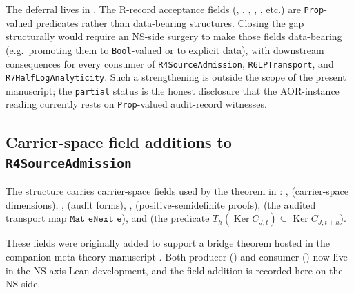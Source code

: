 \documentclass[11pt]{article}
\DeclareMathOperator{\Ker}{Ker}
\theoremstyle{definition}
\begin{document}
The deferral lives in
.  The R-record acceptance
fields (, ,
, ,
, etc.) are \texttt{Prop}-valued
predicates rather than data-bearing structures.  Closing the gap
structurally would require an NS-side surgery to make those fields
data-bearing (e.g.\ promoting them to \texttt{Bool}-valued or to
explicit data), with downstream consequences for every consumer of
\texttt{R4SourceAdmission}, \texttt{R6LPTransport}, and
\texttt{R7HalfLogAnalyticity}.  Such a strengthening is outside the
scope of the present manuscript; the \texttt{partial} status is the
honest disclosure that the AOR-instance reading currently rests on
\texttt{Prop}-valued audit-record witnesses.

\subsection{Carrier-space field additions to \texorpdfstring{\texttt{R4SourceAdmission}}{R4SourceAdmission}}
\label{subsec:paper3-r4-carrier-space-fields}

The structure 
carries carrier-space fields used by the
 theorem in
: , 
(carrier-space dimensions), ,  (audit
forms), ,  (positive-semidefinite
proofs),  (the audited transport map
\(\texttt{Mat eNext e}\)), and  (the predicate
\(T_h(\Ker C_{J,t}) \subseteq \Ker C_{J,t+h}\)).

These fields were originally added to support a bridge theorem
hosted in the companion meta-theory manuscript
\citet{Tsiokos2026AOR}.  Both producer ()
and consumer () now live in the
NS-axis Lean development, and the field addition is recorded here on
the NS side.
 
\clearpage


\end{document}

